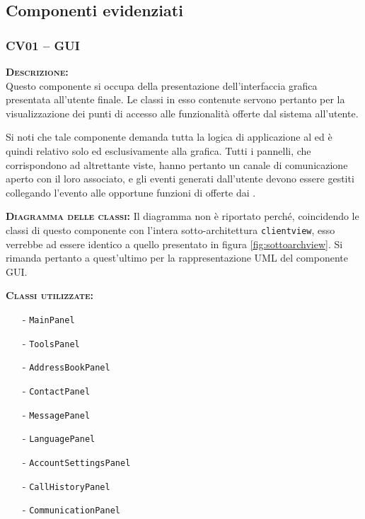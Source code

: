 \subsection{Componenti evidenziati}

\subsubsection{CV01 -- GUI}\label{sec:gui}
\begin{description}
	\item{\scshape\bfseries Descrizione:}\\
Questo componente si occupa della presentazione dell'interfaccia grafica presentata all'utente finale. Le classi in esso contenute servono pertanto per la visualizzazione dei punti di accesso alle funzionalità offerte dal sistema all'utente.

Si noti che tale componente demanda tutta la logica di applicazione al  ed è quindi relativo solo ed esclusivamente alla grafica. Tutti i pannelli, che corrispondono ad altrettante viste, hanno pertanto un canale di comunicazione aperto con il  loro associato, e gli eventi generati dall'utente devono essere gestiti collegando l'evento alle opportune funzioni di  offerte dai .

	\item{\scshape\bfseries Diagramma delle classi:}
Il diagramma non è riportato perché, coincidendo le classi di questo componente con l'intera sotto-architettura \texttt{clientview}, esso verrebbe ad essere identico a quello presentato in figura \vref{fig:sottoarchview}. Si rimanda pertanto a quest'ultimo per la rappresentazione UML del componente GUI\@.
	
	\item{\scshape\bfseries Classi utilizzate:} 
	\begin{itemize}[noitemsep,nolistsep]
		\item[-] \texttt{MainPanel}
		\item[-] \texttt{ToolsPanel}
		\item[-] \texttt{AddressBookPanel}
		\item[-] \texttt{ContactPanel}
		\item[-] \texttt{MessagePanel}
		\item[-] \texttt{LanguagePanel}
		\item[-] \texttt{AccountSettingsPanel}
		\item[-] \texttt{CallHistoryPanel}
		\item[-] \texttt{CommunicationPanel}
	\end{itemize}  
\end{description}

